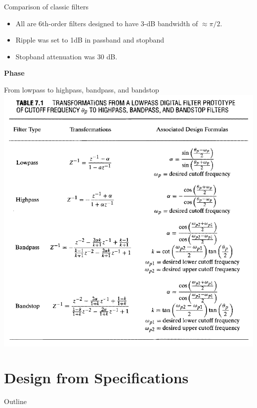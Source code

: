 \documentclass[10pt]{beamer}
\begin{document}
%
\begin{frame}{Comparison of classic filters}
	\begin{itemize}
		\item All are 6th-order filters designed to have 3-dB bandwidth of $\approx \pi/2$.
		\item Ripple was set to 1dB in passband and stopband
		\item Stopband attenuation was 30 dB.
	\end{itemize}
	
	\textbf{Phase}
	\begin{center}
		\resizebox{0.7\linewidth}{!}{}
	\end{center}
	
\end{frame}

%
\begin{frame}{From lowpass to highpass, bandpass, and bandstop}
\centering
\includegraphics[scale=0.6]{figs/filter_transformation.png}
\end{frame}

\section{Design from Specifications}
\begin{frame}{Outline}
	\tableofcontents[currentsection]
\end{frame}
\end{document}

